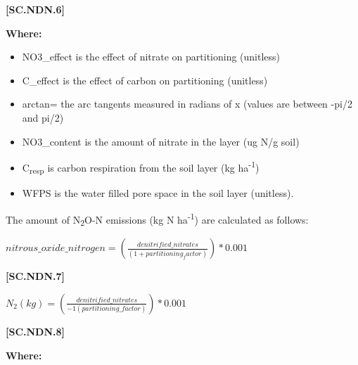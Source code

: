             {\raggedleft \textbf{[SC.NDN.6]}\par}
            \vspace{0.5cm}
            
        
        \textbf{Where:}
            
        \begin{itemize}
            \item NO3\_effect is the effect of nitrate on partitioning (unitless)
            \item C\_effect is the effect of carbon on partitioning (unitless)
            \item arctan= the arc tangents measured in radians of x (values are between -pi/2 and pi/2)
            \item NO3\_content is the amount of nitrate in the layer (ug N/g soil)
            \item C\textsubscript{resp} is carbon respiration from the soil layer (kg ha\textsuperscript{-1})
            \item WFPS is the water filled pore space in the soil layer (unitless). 
        \end{itemize}
        \vspace{0.5cm}

The amount of N\textsubscript{2}O-N emissions (kg N ha\textsuperscript{-1}) are calculated as follows:
\vspace{0.5cm}
            
    \begin{center}
\(nitrous\_oxide\_nitrogen = (\frac{denitrified\_nitrates}{(1 + partitioning_factor)})* 0.001\)
    \end{center}
        \vspace{0.5cm} 
    
            {\raggedleft \textbf{[SC.NDN.7]}\par}
            \vspace{0.5cm}
    \begin{center}
\(N_2(kg)=(\frac{denitrified\_nitrates}{-1(partitioning\_factor)})* 0.001 \)

    \end{center}
        \vspace{0.5cm} 
    
            {\raggedleft \textbf{[SC.NDN.8]}\par}
            \vspace{0.5cm}

        \textbf{Where:}
            
